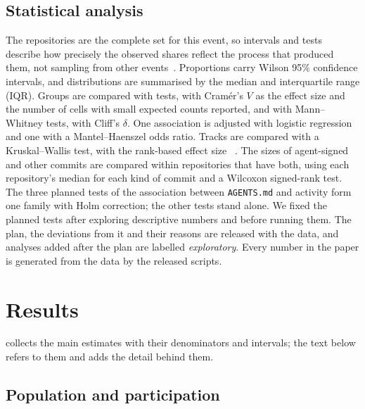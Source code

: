 \documentclass{article}
\begin{document}
\subsection{Statistical analysis}
The repositories are the complete set for this event, so intervals and tests describe how precisely the observed shares reflect the process that produced them, not sampling from other events~\cite{baltes2022sampling}. Proportions carry Wilson 95\% confidence intervals, and distributions are summarised by the median and interquartile range (IQR). Groups are compared with \chisq{} tests, with Cramér's $V$ as the effect size and the number of cells with small expected counts reported, and with Mann--Whitney tests, with Cliff's $\delta$. One association is adjusted with logistic regression and one with a Mantel--Haenszel odds ratio. Tracks are compared with a Kruskal--Wallis test, with the rank-based effect size \epsqformula{}~\cite{tomczak2014effectsize}. The sizes of agent-signed and other commits are compared within repositories that have both, using each repository's median for each kind of commit and a Wilcoxon signed-rank test. The three planned tests of the association between \texttt{AGENTS.md} and activity form one family with Holm correction; the other tests stand alone. We fixed the planned tests after exploring descriptive numbers and before running them. The plan, the deviations from it and their reasons are released with the data, and analyses added after the plan are labelled \emph{exploratory}. Every number in the paper is generated from the data by the released scripts.

\section{Results}\label{sec:results}

 collects the main estimates with their denominators and intervals; the text below refers to them and adds the detail behind them.

\subsection{Population and participation}\label{sec:population}
\end{document}
